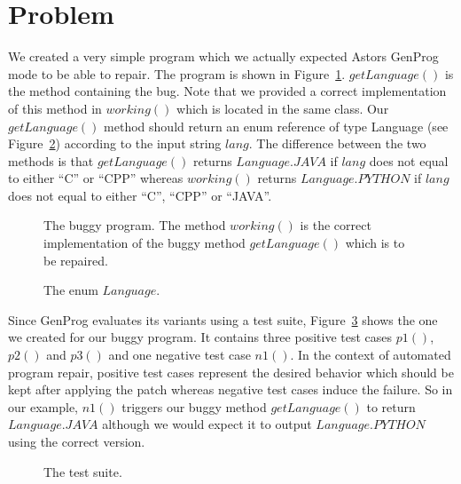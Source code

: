 \documentclass[pdftex,english,oribibl]{llncs}
\begin{document}
 \cite{salam}

\section{Problem}\label{sec:problem}

We created a very simple program which we actually expected Astors GenProg mode to be able to repair.
The program is shown in Figure~\ref{fig:testProgram}.
$getLanguage()$ is the method containing the bug.
Note that we provided a correct implementation of this method in $working()$ which is located in the same class.
Our $getLanguage()$ method should return an enum reference of type Language (see Figure~\ref{fig:enum}) according to the input string $lang$.
The difference between the two methods is that $getLanguage()$ returns $Language.JAVA$ if $lang$ does not equal to either ``C'' or ``CPP'' whereas $working()$ returns $Language.PYTHON$ if $lang$ does not equal to either ``C'', ``CPP'' or ``JAVA''.

\begin{figure}
	\begin{center}
		
	\end{center}
	\caption{The buggy program. The method $working()$ is the correct implementation of the buggy method $getLanguage()$ which is to be repaired.}
	\label{fig:testProgram}
\end{figure}

\begin{figure}
	\begin{center}
		
	\end{center}
	\caption{The enum $Language$.}
	\label{fig:enum}
\end{figure}

Since GenProg evaluates its variants using a test suite, Figure~\ref{fig:testsuite} shows the one we created for our buggy program. It contains three positive test cases $p1()$, $p2()$ and $p3()$ and one negative test case $n1()$. 
In the context of automated program repair, positive test cases represent the desired behavior which should be kept after applying the patch whereas negative test cases induce the failure.
So in our example, $n1()$ triggers our buggy method $getLanguage()$ to return $Language.JAVA$ although we would expect it to output $Language.PYTHON$ using the correct version.

\begin{figure}
\begin{center}

\end{center}
\caption{The test suite.}
\label{fig:testsuite}
\end{figure}
\end{document}
